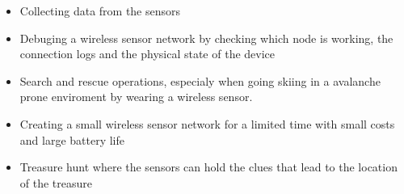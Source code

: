  \begin{itemize} 

\item Collecting data from the sensors \cite{fcint}

\item Debuging a wireless sensor network by checking which node is working, the connection logs and the physical state of the device

\item Search and rescue operations, especialy when going skiing in a avalanche prone enviroment by wearing a wireless sensor. 

\item Creating a small wireless sensor network for a limited time with small costs and large battery life

\item Treasure hunt where the sensors can hold the clues that lead to the location of the treasure
 
\end{itemize}

